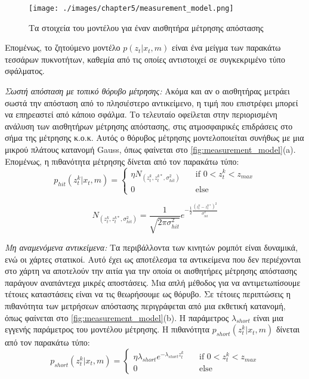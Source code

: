 \begin{figure}[!ht]
    \centering
    \texttt{[image: ./images/chapter5/measurement\_model.png]}
    \caption{Τα στοιχεία του μοντέλου για έναν αισθητήρα μέτρησης απόστασης}
    \label{fig:measurement_model}
\end{figure} 

Επομένως, το ζητούμενο μοντέλο $p(z_t | x_t, m)$ είναι ένα μείγμα των παρακάτω τεσσάρων πυκνοτήτων, καθεμία από τις οποίες αντιστοιχεί σε συγκεκριμένο τύπο σφάλματος.

\emph{Σωστή απόσταση με τοπικό θόρυβο μέτρησης:} Ακόμα και αν ο αισθητήρας μετράει σωστά την απόσταση από το πλησιέστερο αντικείμενο, η τιμή που επιστρέφει μπορεί να επηρεαστεί από κάποιο σφάλμα. Το τελευταίο οφείλεται στην περιορισμένη ανάλυση των αισθητήρων μέτρησης απόστασης, στις ατμοσφαιρικές επιδράσεις στο σήμα της μέτρησης κ.ο.κ. Αυτός ο θόρυβος μέτρησης μοντελοποιείται συνήθως με μια μικρού πλάτους κατανομή Gauss, όπως φαίνεται στο \autoref{fig:measurement_model}(a). Επομένως, η πιθανότητα μέτρησης δίνεται από τον παρακάτω τύπο:
\begin{equation*}
 p_{hit}(z_t^k | x_t, m) =
  \begin{cases}
    \eta N_(z_t^k, z_t^{k*}, \sigma_{hit}^2) & \quad \text{if } 0 < z_t^k < z_{max}\\
    0  & \quad \text{else}
  \end{cases}
\end{equation*}

\begin{equation*}
    N_(z_t^k, z_t^{k*}, \sigma_{hit}^2) = \frac{1}{\sqrt{2\pi\sigma_{hit}^2}} e^{-\frac{1}{2} \frac{(z_t^k - z_t^{k*})^2}{\sigma_{hit}^2} }
\end{equation*}

\emph{Μη αναμενόμενα αντικείμενα:} Τα περιβάλλοντα των κινητών ρομπότ είναι δυναμικά, ενώ οι χάρτες στατικοί. Αυτό έχει ως αποτέλεσμα τα αντικείμενα που δεν περιέχονται στο χάρτη να αποτελούν την αιτία για την οποία οι αισθητήρες μέτρησης απόστασης παράγουν αναπάντεχα μικρές αποστάσεις. Μια απλή μέθοδος για να αντιμετωπίσουμε τέτοιες καταστάσεις είναι να τις θεωρήσουμε ως θόρυβο. Σε τέτοιες περιπτώσεις η πιθανότητα των μετρήσεων απόστασης περιγράφεται από μια εκθετική κατανομή, όπως φαίνεται στο \autoref{fig:measurement_model}(b). Η παράμετρος $\lambda_{short}$ είναι μια εγγενής παράμετρος του μοντέλου μέτρησης. Η πιθανότητα $p_{short}(z_t^k | x_t, m)$ δίνεται από τον παρακάτω τύπο:
\begin{equation*}
 p_{short}(z_t^k | x_t, m) =
  \begin{cases}
    \eta \lambda_{short} e^{-\lambda_{short} z_t^k} & \quad \text{if } 0 < z_t^k < z_{max}\\
    0  & \quad \text{else}
  \end{cases}
\end{equation*}

